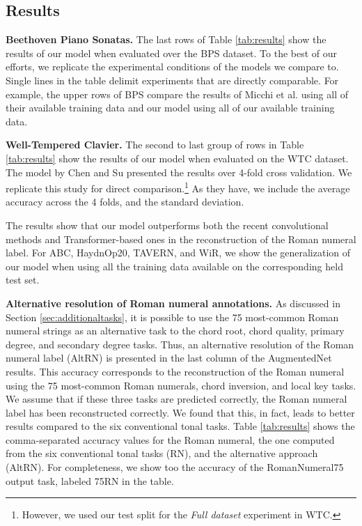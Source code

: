 \subsection{Results}


\textbf{Beethoven Piano Sonatas.} The last rows of Table \ref{tab:results} show the results of our model when evaluated over the BPS dataset. 
To the best of our efforts, we replicate the experimental conditions of the models we compare to. Single lines in the table delimit experiments that are directly comparable. 
For example, the upper rows of BPS compare the results of Micchi et al. \cite{micchi_not_2020} using all of their available training data and our model using all of our available training data. 

\textbf{Well-Tempered Clavier.}
The second to last group of rows in Table \ref{tab:results} show the results of our model when evaluated on the WTC dataset.
The model by Chen and Su \cite{chen_attend_2021} presented the results over 4-fold cross validation. We replicate this study for direct comparison.\footnote{However, we used our test split for the \emph{Full dataset} experiment in WTC.} As they have, we include the average accuracy across the 4 folds, and the standard deviation. 

The results show that our model outperforms both the recent convolutional methods \cite{micchi_not_2020} and Transformer-based ones \cite{chen_attend_2021} in the reconstruction of the Roman numeral label. 
For ABC, HaydnOp20, TAVERN, and WiR, we show the generalization of our model when using all the training data available on the corresponding held test set. 

\textbf{Alternative resolution of Roman numeral annotations.}
As discussed in Section \ref{sec:additionaltasks}, it is possible to use the 75 most-common Roman numeral strings as an alternative task to the chord root, chord quality, primary degree, and secondary degree tasks. 
Thus, an alternative resolution of the Roman numeral label (AltRN) is presented in the last column of the AugmentedNet results. This accuracy corresponds to the reconstruction of the Roman numeral using the 75 most-common Roman numerals, chord inversion, and local key tasks. 
We assume that if these three tasks are predicted correctly, the Roman numeral label has been reconstructed correctly.
We found that this, in fact, leads to better results compared to the six conventional tonal tasks. 
Table \ref{tab:results} shows the comma-separated accuracy values for the Roman numeral, the one computed from the six conventional tonal tasks (RN), and the alternative approach (AltRN). For completeness, we show too the accuracy of the RomanNumeral75 output task, labeled 75RN in the table.

